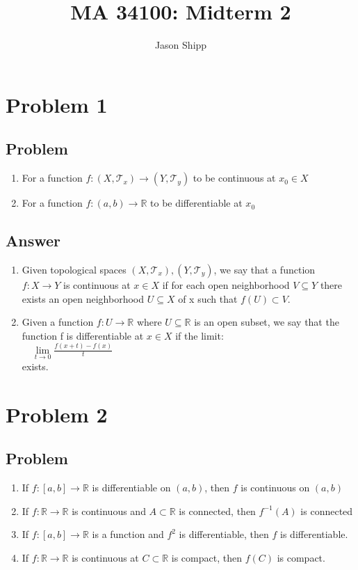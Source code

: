 \documentclass{article}
\newcommand\tab[1][1cm]{\hspace*{#1}}
\begin{document}
\title{MA 34100: Midterm 2}
\author{Jason Shipp}
\maketitle
\section*{Problem 1}
\subsection*{Problem}
\begin{enumerate}[label=(\alph*)]
	\item For a function \(f: (X, \mathcal{T}_{x}) \rightarrow (Y, \mathcal{T}_{y})\) to be continuous at \(x_{0} \in X\)
	\item For a function \(f: (a,b) \rightarrow \mathbb{R}\) to be differentiable at \(x_{0}\)
\end{enumerate}
\subsection*{Answer}
\begin{enumerate}[label=(\alph*)]
	\item Given topological spaces \((X, \mathcal{T}_{x}), (Y, \mathcal{T}_{y})\), we say that a function \(f:X \rightarrow Y\) is
	         continuous at \(x \in X\) if for each open neighborhood \(V \subseteq Y\) there exists an open neighborhood 
                    \(U \subseteq X\) of x such that \(f(U) \subset V\).
	\item Given a function \(f:U \rightarrow \mathbb{R}\) where \(U \subseteq \mathbb{R}\) is an open subset, we say that the
	         function f is differentiable at \(x \in X\) if the limit: \\
	         \tab[1cm] \(\quad \lim\limits_{t \to 0} \frac{f(x + t) - f(x)}{t}\) \\
	         exists.
\end{enumerate}
\section*{Problem 2}
\subsection*{Problem}
\begin{enumerate}[label=(\alph*)]
	\item If \(f: [a,b] \to \mathbb{R}\) is differentiable on \((a,b)\), then \(f\) is continuous on \((a,b)\)
	\item If \(f: \mathbb{R} \to \mathbb{R}\) is continuous and \(A \subset \mathbb{R}\) is connected, then \(f^{-1}(A)\) is connected
	\item If \(f:[a,b] \to \mathbb{R}\) is a function and \(f^{2}\) is differentiable, then \(f\) is differentiable.
	\item If \(f: \mathbb{R} \to \mathbb{R}\) is continuous at \(C \subset \mathbb{R}\) is compact, then \(f(C)\) is compact.
\end{enumerate}
\end{document}
